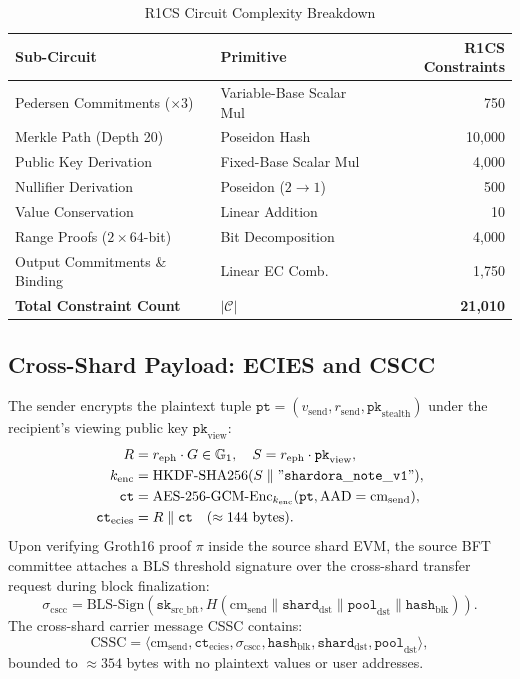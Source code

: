 \documentclass[sigconf,nonacm]{acmart}
\begin{document}
\begin{table}[H]
\centering
\caption{R1CS Circuit Complexity Breakdown}
\label{tab:r1cs_complexity}
\small
\begin{tabular}{llr}
\toprule
\textbf{Sub-Circuit} & \textbf{Primitive} & \textbf{R1CS Constraints} \\
\midrule
Pedersen Commitments ($\times 3$) & Variable-Base Scalar Mul & 750 \\
Merkle Path (Depth 20) & Poseidon Hash & 10,000 \\
Public Key Derivation & Fixed-Base Scalar Mul & 4,000 \\
Nullifier Derivation & Poseidon ($2 \to 1$) & 500 \\
Value Conservation & Linear Addition & 10 \\
Range Proofs ($2 \times 64$-bit) & Bit Decomposition & 4,000 \\
Output Commitments \& Binding & Linear EC Comb. & 1,750 \\
\midrule
\textbf{Total Constraint Count} & $|\mathcal{C}|$ & \textbf{21,010} \\
\bottomrule
\end{tabular}
\end{table}

\subsection{Cross-Shard Payload: ECIES and CSCC}
The sender encrypts the plaintext tuple $\mathtt{pt} = (v_{\text{send}}, r_{\text{send}}, \mathtt{pk}_{\text{stealth}})$ under the recipient's viewing public key $\mathtt{pk}_{\text{view}}$:
\begin{align}
R &= r_{\text{eph}} \cdot G \in \mathbb{G}_1, \quad S = r_{\text{eph}} \cdot \mathtt{pk}_{\text{view}}, \\
k_{\text{enc}} &= \text{HKDF-SHA256}(S \parallel \mathtt{"shardora\_note\_v1"}), \\
\mathtt{ct} &= \text{AES-256-GCM-Enc}_{k_{\text{enc}}}(\mathtt{pt}, \text{AAD} = \text{cm}_{\text{send}}), \\
\mathtt{ct}_{\text{ecies}} &= R \parallel \mathtt{ct} \quad (\approx 144 \text{ bytes}).
\end{align}
Upon verifying Groth16 proof $\pi$ inside the source shard EVM, the source BFT committee attaches a BLS threshold signature over the cross-shard transfer request during block finalization:
\begin{equation}
\sigma_{\text{cscc}} = \text{BLS-Sign}(\mathtt{sk}_{\text{src\_bft}}, H(\text{cm}_{\text{send}} \parallel \mathtt{shard}_{\text{dst}} \parallel \mathtt{pool}_{\text{dst}} \parallel \mathtt{hash}_{\text{blk}})).
\end{equation}
The cross-shard carrier message CSSC contains:
\begin{equation}
\text{CSSC} = \langle \text{cm}_{\text{send}}, \mathtt{ct}_{\text{ecies}}, \sigma_{\text{cscc}}, \mathtt{hash}_{\text{blk}}, \mathtt{shard}_{\text{dst}}, \mathtt{pool}_{\text{dst}} \rangle,
\end{equation}
bounded to $\approx 354$ bytes with no plaintext values or user addresses.
\end{document}
